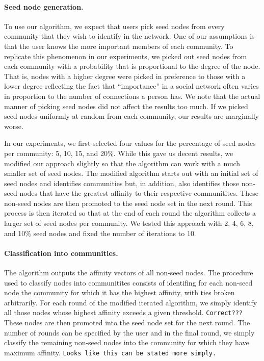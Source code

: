 \paragraph{Seed node generation.} 
To use our algorithm, we expect that users pick seed nodes from 
every community that they wish to identify in the network. One of our assumptions is that
the user knows the more important members of each community. To replicate 
this phenomenon in our experiments, we picked out seed nodes from each community 
with a probability that is proportional to the degree of the node. That is, nodes
with a higher degree were picked in preference to those with a lower degree reflecting the 
fact that ``importance'' in a social network often varies in proportion to the number of 
connections a person has. We note that the actual manner of picking seed nodes did not 
affect the results too much. If we picked seed nodes uniformly at random from each community, 
our results are marginally worse. 

In our experiments, we first selected four values for the percentage of seed nodes 
per community: 5, 10, 15, and 20$\%$. While this gave us decent results, we modified our 
approach slightly so that the algorithm can work with a much smaller set of seed nodes. 
The modified algorithm starts out with an initial set of seed nodes and identifies 
communities but, in addition, also identifies those non-seed nodes that have the 
greatest affinity to their respective communitites. These non-seed nodes are then promoted 
to the seed node set in the next round. This process is then iterated so that at the end of each 
round the algorithm collects a larger set of seed nodes per community. We tested this approach with 
2, 4, 6, 8, and 10$\%$ seed nodes and fixed the number of iterations to 10. 

\paragraph{Classification into communities.}
The algorithm outputs the affinity vectors of all non-seed nodes. The procedure 
used to classify nodes into communitites consists of identifing for each non-seed 
node the community for which it has the highest affinity, with ties broken arbitrarily. 
For each round of the modified iterated algorithm, we simply identify all those nodes 
whose highest affinity exceeds a given threshold. \texttt{Correct???} These nodes are then 
promoted into the seed node set for the next round. The number of rounds can be specified by 
the user and in the final round, we simply classify the remaining non-seed nodes into the community
for which they have maximum affinity. \texttt{Looks like this can be stated more simply.}

